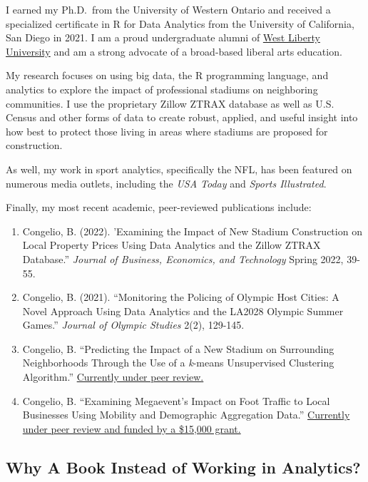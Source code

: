 \documentclass[
  letterpaper,
]{krantz}
\begin{document}
I earned my Ph.D.~from the University of Western Ontario and received a
specialized certificate in R for Data Analytics from the University of
California, San Diego in 2021. I am a proud undergraduate alumni of
\href{https://westliberty.edu/}{West Liberty University} and am a strong
advocate of a broad-based liberal arts education.

My research focuses on using big data, the R programming language, and
analytics to explore the impact of professional stadiums on neighboring
communities. I use the proprietary Zillow ZTRAX database as well as U.S.
Census and other forms of data to create robust, applied, and useful
insight into how best to protect those living in areas where stadiums
are proposed for construction.

As well, my work in sport analytics, specifically the NFL, has been
featured on numerous media outlets, including the \emph{USA Today} and
\emph{Sports Illustrated}.

Finally, my most recent academic, peer-reviewed publications include:

\begin{enumerate}
\def\labelenumi{\arabic{enumi}.}
\item
  Congelio, B. (2022). 'Examining the Impact of New Stadium Construction
  on Local Property Prices Using Data Analytics and the Zillow ZTRAX
  Database.'' \emph{Journal of Business, Economics, and Technology}
  Spring 2022, 39-55.
\item
  Congelio, B. (2021). ``Monitoring the Policing of Olympic Host Cities:
  A Novel Approach Using Data Analytics and the LA2028 Olympic Summer
  Games.'' \emph{Journal of Olympic Studies} 2(2), 129-145.
\item
  Congelio, B. ``Predicting the Impact of a New Stadium on Surrounding
  Neighborhoods Through the Use of a \emph{k}-means Unsupervised
  Clustering Algorithm.'' \uline{Currently under peer review.}
\item
  Congelio, B. ``Examining Megaevent's Impact on Foot Traffic to Local
  Businesses Using Mobility and Demographic Aggregation Data.''
  \uline{Currently under peer review and funded by a \$15,000 grant.}
\end{enumerate}

\hypertarget{why-a-book-instead-of-working-in-analytics}{%
\subsection{Why A Book Instead of Working in
Analytics?}\label{why-a-book-instead-of-working-in-analytics}}
\end{document}
